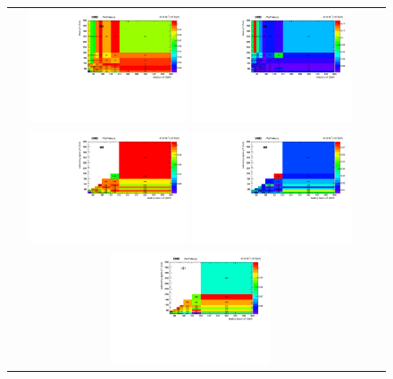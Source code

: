 \begin{figure}[!htb]
  \begin{center}
    \begin{tabular}{cc}
      \includegraphics[width=0.45\textwidth]{fig_2017_TrigSF/h2D_lepABpt_emu.pdf}
      \includegraphics[width=0.45\textwidth]{fig_2017_TrigSF/h2D_lepABpt_emu_BinErrors.pdf}\\       
      \includegraphics[width=0.45\textwidth]{fig_2017_TrigSF/h2D_lepABpt_ee.pdf}
      \includegraphics[width=0.45\textwidth]{fig_2017_TrigSF/h2D_lepABpt_ee_BinErrors.pdf}\\
      \includegraphics[width=0.45\textwidth]{fig_2017_TrigSF/h2D_lepABpt_mumu.pdf}

\end{tabular}
\end{center}
\end{figure}
